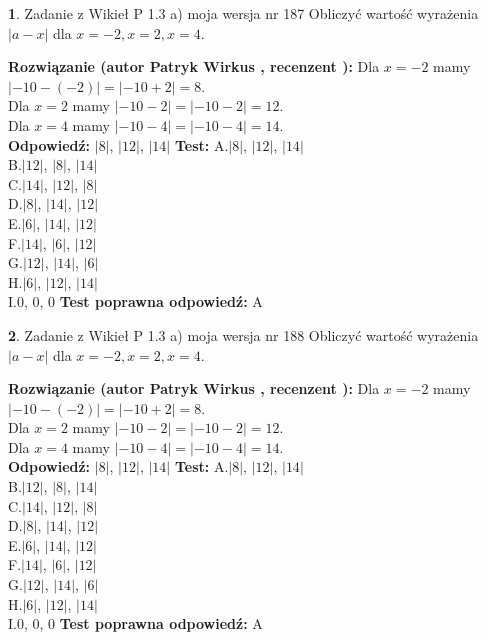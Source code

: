 \documentclass[12pt, a4paper]{article}
\theoremstyle{definition} %
\newtheorem{zad}{}
\newcommand{\zadStart}[1]{\begin{zad}#1\newline}
\newcommand{\zadStop}{\end{zad}}
\newcommand{\rozwStart}[2]{\noindent \textbf{Rozwiązanie (autor #1 , recenzent #2): }\newline}
\newcommand{\rozwStop}{\newline}
\newcommand{\odpStart}{\noindent \textbf{Odpowiedź:}\newline}
\newcommand{\odpStop}{\newline}
\newcommand{\testStart}{\noindent \textbf{Test:}\newline}
\newcommand{\testStop}{\newline}
\newcommand{\kluczStart}{\noindent \textbf{Test poprawna odpowiedź:}\newline}
\newcommand{\kluczStop}{\newline}
\begin{document}
\zadStart{Zadanie z Wikieł P 1.3 a) moja wersja nr 187}
Obliczyć wartość wyrażenia $|a - x|$ dla $x=-2,x=2,x=4$.
\zadStop
\rozwStart{Patryk Wirkus}{}
Dla $x = -2$ mamy $|-10 - (-2)| = |-10 + 2| = 8$.\\
Dla $x = 2$ mamy $|-10 - 2| = |-10 - 2| = 12$.\\
Dla $x = 4$ mamy $|-10 - 4| = |-10 - 4| = 14$.\\
\rozwStop
\odpStart
$|8|$, $|12|$, $|14|$
\odpStop
\testStart
A.$|8|$, $|12|$, $|14|$\\
B.$|12|$, $|8|$, $|14|$\\
C.$|14|$, $|12|$, $|8|$\\
D.$|8|$, $|14|$, $|12|$\\
E.$|6|$, $|14|$, $|12|$\\
F.$|14|$, $|6|$, $|12|$\\
G.$|12|$, $|14|$, $|6|$\\
H.$|6|$, $|12|$, $|14|$\\
I.$0$, $0$, $0$
\testStop
\kluczStart
A
\kluczStop



\zadStart{Zadanie z Wikieł P 1.3 a) moja wersja nr 188}
Obliczyć wartość wyrażenia $|a - x|$ dla $x=-2,x=2,x=4$.
\zadStop
\rozwStart{Patryk Wirkus}{}
Dla $x = -2$ mamy $|-10 - (-2)| = |-10 + 2| = 8$.\\
Dla $x = 2$ mamy $|-10 - 2| = |-10 - 2| = 12$.\\
Dla $x = 4$ mamy $|-10 - 4| = |-10 - 4| = 14$.\\
\rozwStop
\odpStart
$|8|$, $|12|$, $|14|$
\odpStop
\testStart
A.$|8|$, $|12|$, $|14|$\\
B.$|12|$, $|8|$, $|14|$\\
C.$|14|$, $|12|$, $|8|$\\
D.$|8|$, $|14|$, $|12|$\\
E.$|6|$, $|14|$, $|12|$\\
F.$|14|$, $|6|$, $|12|$\\
G.$|12|$, $|14|$, $|6|$\\
H.$|6|$, $|12|$, $|14|$\\
I.$0$, $0$, $0$
\testStop
\kluczStart
A
\kluczStop
\end{document}
